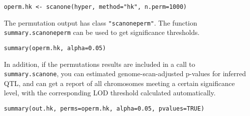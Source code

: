 \documentclass[10pt,letterpaper]{article}
\newcommand{\usercolor}{\color [named]{BlueViolet}}
\begin{document}
\begin{enumerate}
\usercolor 
\verb|operm.hk <- scanone(hyper, method="hk", n.perm=1000)|
\normalcolor

The permutation output has class \verb-"scanoneperm"-.  The function
\verb-summary.scanoneperm- can be used to get significance
thresholds.  

\usercolor 
\verb|summary(operm.hk, alpha=0.05)| 
\normalcolor

In addition, if the permutations results are included in a call to
\verb-summary.scanone-, you can estimated genome-scan-adjusted
p-values for inferred QTL, and can get a report of all chromosomes
meeting a certain significance level, with the corresponding LOD
threshold calculated automatically.

\usercolor
\verb|summary(out.hk, perms=operm.hk, alpha=0.05, pvalues=TRUE)|
\normalcolor

%
%
%
%
%
%
%
%




\end{enumerate}
\end{document}
